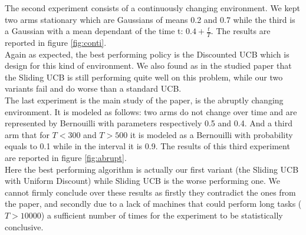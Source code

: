 The second experiment consists of a continuously changing environment. We kept two arms stationary which are Gaussians of means 0.2 and 0.7 while the third is a Gaussian with a mean dependant of the time t: $0.4 + \frac{t}{T}$. The results are reported in figure \ref{fig:conti}.\\
Again as expected, the best performing policy is the Discounted UCB which is design for this kind of environment. We also found as in the studied paper that the Sliding UCB is still performing quite well on this problem, while our two variants fail and do worse than a standard UCB.\\

The last experiment is the main study of the paper, is the abruptly changing environment. It is modeled as follows: two arms do not change over time and are represented by Bernouilli with parameters respectively 0.5 and 0.4. And a third arm that for $T < 300 $ and $T > 500$ it is modeled as a Bernouilli with probability equals to 0.1 while in the interval it is 0.9. The results of this third experiment are reported in figure \ref{fig:abrupt}.\\
Here the best performing algorithm is actually our first variant (the Sliding UCB with Uniform Discount) while Sliding UCB is the worse performing one. We cannot firmly conclude over these results as firstly they contradict the ones from the paper, and secondly due to a lack of machines that could perform long tasks ($T>10000$) a sufficient number of times for the experiment to be statistically conclusive.